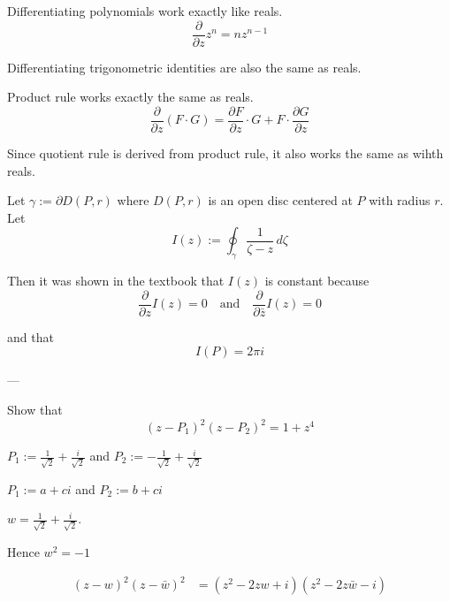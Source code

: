 \def\pp#1#2{\frac{\partial #1}{\partial #2}}

\label{f107aed}

Differentiating polynomials work exactly like reals.
$$
  \pp{}z z^n=nz^{n-1}
$$

Differentiating trigonometric identities are also the same as reals.

Product rule works exactly the same as reals.
$$
  \pp{}z(F\cdot G)=\pp Fz\cdot G+F\cdot\pp Gz
$$

Since quotient rule is derived from product rule, it also works the same as
wihth reals.

\label{fbc836e}

Let $\gamma:=\partial D(P,r)$ where $D(P,r)$ is an open disc centered at $P$
with radius $r$. Let
$$
  I(z):=\oint_\gamma\frac1{\zeta-z}\,d\zeta
$$

Then it was shown in the textbook that $I(z)$ is constant because
$$
  \pp{}zI(z)=0\quad\text{and}\quad\pp{}{\bar z}I(z)=0
$$

and that
$$
  I(P)=2\pi i
$$

---

Show that
$$
  (z-P_1)^2(z-P_2)^2=1+z^4
$$

$P_1:=\frac1{\sqrt2}+\frac i{\sqrt2}$ and $P_2:=-\frac1{\sqrt2}+\frac i{\sqrt2}$

$P_1:=a+ci$ and $P_2:=b+ci$

$w=\frac1{\sqrt2}+\frac i{\sqrt2}$.

Hence $w^2=-1$

\begin{align*}
  (z-w)^2(z-\bar w)^2
   & = (z^2-2zw+i)(z^2-2z\bar w-i) \\
\end{align*}
